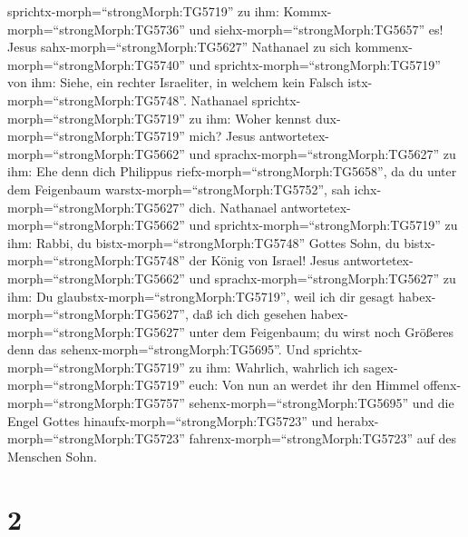 sprichtx-morph=``strongMorph:TG5719'' zu ihm:
Kommx-morph=``strongMorph:TG5736'' und
siehx-morph=``strongMorph:TG5657'' es!  Jesus
sahx-morph=``strongMorph:TG5627'' Nathanael zu sich
kommenx-morph=``strongMorph:TG5740'' und
sprichtx-morph=``strongMorph:TG5719'' von ihm: Siehe, ein rechter
Israeliter, in welchem kein Falsch istx-morph=``strongMorph:TG5748''.
 Nathanael sprichtx-morph=``strongMorph:TG5719'' zu ihm:
Woher kennst dux-morph=``strongMorph:TG5719'' mich? Jesus
antwortetex-morph=``strongMorph:TG5662'' und
sprachx-morph=``strongMorph:TG5627'' zu ihm: Ehe denn dich Philippus
riefx-morph=``strongMorph:TG5658'', da du unter dem Feigenbaum
warstx-morph=``strongMorph:TG5752'', sah
ichx-morph=``strongMorph:TG5627'' dich.  Nathanael
antwortetex-morph=``strongMorph:TG5662'' und
sprichtx-morph=``strongMorph:TG5719'' zu ihm: Rabbi, du
bistx-morph=``strongMorph:TG5748'' Gottes Sohn, du
bistx-morph=``strongMorph:TG5748'' der König von Israel! 
Jesus antwortetex-morph=``strongMorph:TG5662'' und
sprachx-morph=``strongMorph:TG5627'' zu ihm: Du
glaubstx-morph=``strongMorph:TG5719'', weil ich dir gesagt
habex-morph=``strongMorph:TG5627'', daß ich dich gesehen
habex-morph=``strongMorph:TG5627'' unter dem Feigenbaum; du wirst noch
Größeres denn das sehenx-morph=``strongMorph:TG5695''.  Und
sprichtx-morph=``strongMorph:TG5719'' zu ihm: Wahrlich, wahrlich ich
sagex-morph=``strongMorph:TG5719'' euch: Von nun an werdet ihr den
Himmel offenx-morph=``strongMorph:TG5757''
sehenx-morph=``strongMorph:TG5695'' und die Engel Gottes
hinaufx-morph=``strongMorph:TG5723'' und
herabx-morph=``strongMorph:TG5723'' fahrenx-morph=``strongMorph:TG5723''
auf des Menschen Sohn.

\hypertarget{section-1}{%
\section{2}\label{section-1}}

